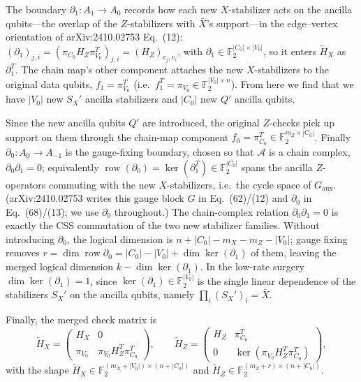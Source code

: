 \documentclass[a4paper, 12pt]{article}
\begin{document}
  The boundary $\partial_1: A_1 \to A_0$ records how each new $X$-stabilizer acts on the ancilla qubits---the overlap of the $Z$-stabilizers with $\bar{X}$'s support---in the edge--vertex orientation of arXiv:2410.02753 Eq.~(12): $(\partial_1)_{j,i} = (\pi_{C_0} H_Z \pi_{V_0}^{T})_{j,i} = (H_Z)_{c_j, v_i}$, with $\partial_1 \in \mathbb{F}_2^{|C_0|\times|V_0|}$, so it enters $\tilde H_X$ as $\partial_1^T$. The chain map's other component attaches the new $X$-stabilizers to the original data qubits, $f_1 = \pi_{V_0}^T$ (i.e.\ $f_1^T = \pi_{V_0} \in \mathbb{F}_2^{|V_0|\times n}$). From here we find that we have $|V_0|$ new $S_X'$ ancilla stabilizers and $|C_0|$ new $Q'$ ancilla qubits.

  Since the new ancilla qubits $Q'$ are introduced, the original $Z$-checks pick up support on them through the chain-map component $f_0 = \pi_{C_0}^T \in \mathbb{F}_2^{m_Z\times  |C_0|}$. Finally $\partial_0: A_0 \to A_{-1}$ is the gauge-fixing boundary, chosen so that $\mathcal{A}$ is a chain complex, $\partial_0 \partial_1 = 0$; equivalently $\operatorname{row}(\partial_0) = \ker(\partial_1^T) \in \mathbb{F}_2^{|C_0|}$ spans the ancilla $Z$-operators commuting with the new $X$-stabilizers, i.e.\ the cycle space of $G_{\mathrm{aux}}$. (arXiv:2410.02753 writes this gauge block $G$ in Eq.~(62)/(12) and $\partial_0$ in Eq.~(68)/(13); we use $\partial_0$ throughout.) The chain-complex relation $\partial_0 \partial_1 = 0$ is exactly the CSS commutation of the two new stabilizer families. Without introducing $\partial_0$, the logical dimension is $n+|C_0|-m_X-m_Z-|V_0|$; gauge fixing removes $r= \dim \operatorname{row} \partial_0=|C_0|-|V_0|+\dim \ker(\partial_1)$ of them, leaving the merged logical dimension $k-\dim \ker(\partial_1)$. In the low-rate surgery $\dim \ker(\partial_1)=1$, since $\ker(\partial_1) \in \mathbb{F}_2^{|V_0|}$ is the single linear dependence of the stabilizers $S_X'$ on the ancilla qubits, namely $\prod_i (S_X')_i = \bar X$.

  
  Finally, the merged check matrix is
  \begin{equation}
  \tilde H_X =
  \begin{pmatrix}
  H_X & 0 \\
  \pi_{V_0} & \pi_{V_0} H_Z^{T} \pi_{C_0}^{T}
  \end{pmatrix},
  \qquad
  \tilde H_Z =
  \begin{pmatrix}
  H_Z & \pi_{C_0}^{T} \\
  0 & \ker\left(\pi_{V_0} H_Z^{T} \pi_{C_0}^{T} \right)
  \end{pmatrix},
  \end{equation}
  with the shape $\tilde H_X \in \mathbb{F}_2^{(m_X+|V_0|)\times(n+|C_0|)}$ and $
  \tilde H_Z \in \mathbb{F}_2^{(m_Z+r)\times(n+|C_0|)}$.
\end{document}
